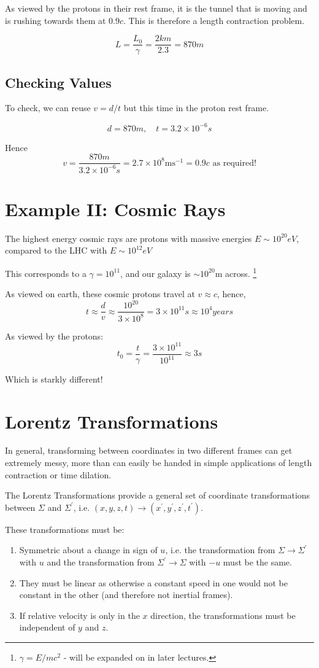 As viewed by the protons in their rest frame, it is the tunnel that is moving and is rushing towards them at $0.9c$. This is therefore a length contraction problem.

\[
    L = \frac{L_0}{\gamma} = \frac{2 \si{km}}{2.3} = 870 \si{m}
\]

\subsection{Checking Values}
To check, we can reuse $v = d/t$ but this time in the proton rest frame.

\[
    d = 870\si{m}, \quad t = 3.2 \times 10^{-6} \si{s}
\]

Hence
\[
    v = \frac{870 \si{m}}{3.2 \times 10^{-6} \si{s}} = 2.7 \times 10^8 \si{\metre\second^{-1}} = 0.9c \text{ as required!}
\]

\section{Example II: Cosmic Rays}
The highest energy cosmic rays are protons with massive energies $E \sim 10^{20} \si{eV}$, compared to the LHC with $E \sim 10^{12} \si{eV}$

This corresponds to a $\gamma = 10^{11}$, and our galaxy is $\sim 10^{20}$m across. \footnote{$\gamma = E/mc^2$ - will be expanded on in later lectures.}

As viewed on earth, these cosmic protons travel at $v \approx c$, hence,
\[
    t \approx \frac{d}{v} \approx \frac{10^{20}}{3 \times 10^8} = 3 \times 10^{11} \si{s} \approx 10^4 \si{ years}
\]

As viewed by the protons:
\[
    t_0 = \frac{t}{\gamma} = \frac{3 \times 10^{11}}{10^{11}} \approx 3 \si{s}
\]

Which is starkly different!

\section{Lorentz Transformations}
In general, transforming between coordinates in two different frames can get extremely messy, more than can easily be handed in simple applications of length contraction or time dilation.

The Lorentz Transformations provide a general set of coordinate transformations between $\Sigma$ and $\Sigma^\prime$, i.e. $(x, y, z, t) \to (x^\prime, y^\prime, z^\prime, t^\prime)$.

These transformations must be:
\begin{enumerate}
    \item Symmetric about a change in sign of $u$, i.e. the transformation from $\Sigma \to \Sigma^\prime$ with $u$ and the transformation from $\Sigma^\prime \to \Sigma$ with $-u$ must be the same.
    \item They must be linear as otherwise a constant speed in one would not be constant in the other (and therefore not inertial frames).
    \item If relative velocity is only in the $x$ direction, the transformations must be independent of $y$ and $z$.
\end{enumerate}


